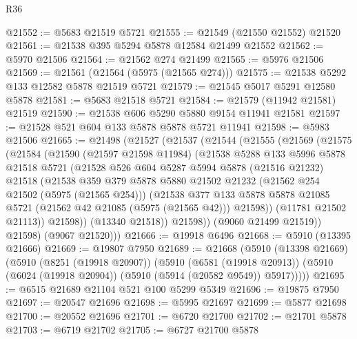 \begin{lexlean}{R36}
\begin{coremodule}
@21552 := @5683 @21519 @5721
@21555 := @21549 (@21550 @21552) @21520
@21561 := @21538 @395 @5294 @5878 @12584 @21499 @21552
@21562 := @5970 @21506
@21564 := @21562 @274 @21499
@21565 := @5976 @21506
@21569 := @21561 (@21564 (@5975 (@21565 @274)))
@21575 := @21538 @5292 @133 @12582 @5878 @21519 @5721
@21579 := @21545 @5017 @5291 @12580 @5878
@21581 := @5683 @21518 @5721
@21584 := @21579 (@11942 @21581) @21519
@21590 := @21538 @606 @5290 @5880 @9154 @11941 @21581
@21597 := @21528 @521 @604 @133 @5878 @5878 @5721 @11941
@21598 := @5983 @21506
@21665 := @21498
    (@21527
      (@21537
        (@21544
          (@21555
            (@21569
              (@21575
                (@21584
                  (@21590
                    (@21597 @21598 @11984)
                    (@21538
                      @5288
                      @133
                      @5996
                      @5878
                      @21518
                      @5721
                      (@21528
                        @526
                        @604
                        @5287
                        @5994
                        @5878
                        (@21516 @21232)
                        @21518
                        (@21538
                          @359
                          @379
                          @5878
                          @5880
                          @21502
                          @21232
                          (@21562 @254 @21502 (@5975 (@21565 @254)))
                          (@21538
                            @377
                            @133
                            @5878
                            @5878
                            @21085
                            @5721
                            (@21562 @42 @21085 (@5975 (@21565 @42)))
                            @21598))
                        (@11781 @21502 @21113))
                      @21598))
                  (@13340 @21518))
                @21598))
            (@9060 @21499 @21519))
          @21598)
        (@9067 @21520)))
@21666 := @19918 @6496
@21668 := @5910 (@13395 @21666)
@21669 := @19807 @7950
@21689 := @21668
    (@5910
      (@13398 @21669)
      (@5910
        (@8251 (@19918 @20907))
        (@5910
          (@6581 (@19918 @20913))
          (@5910 (@6024 (@19918 @20904)) (@5910 (@5914 (@20582 @9549)) @5917)))))
@21695 := @6515 @21689 @21104 @521 @100 @5299 @5349
@21696 := @19875 @7950
@21697 := @20547 @21696
@21698 := @5995 @21697
@21699 := @5877 @21698
@21700 := @20552 @21696
@21701 := @6720 @21700
@21702 := @21701 @5878
@21703 := @6719 @21702
@21705 := @6727 @21700 @5878

\end{coremodule}
\end{lexlean}

